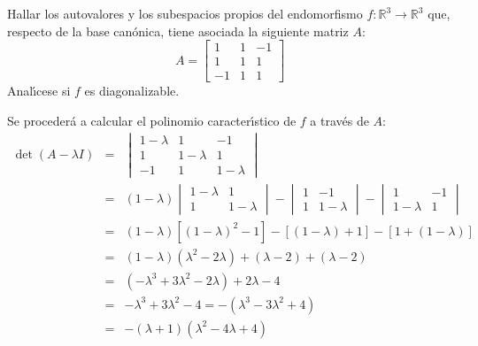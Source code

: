 \begin{enunciado}
 Hallar los autovalores y los subespacios propios del endomorfismo $f:\mathbb{R}^3 \rightarrow \mathbb{R}^3$ que, respecto de la base can\'onica, tiene asociada la siguiente matriz $A$:
 \begin{equation*}
  A = 
  \begin{bmatrix}
    1 & 1 & -1 \\
    1 & 1 &  1 \\
   -1 & 1 &  1
  \end{bmatrix}
 \end{equation*}
 Anal\'{\i}cese si $f$ es diagonalizable.
\end{enunciado}

\begin{solucion}
 Se proceder\'a a calcular el polinomio caracter\'{\i}stico de $f$ a trav\'es de $A$:
 \begin{eqnarray*}
  \det(A - \lambda I) & = & 
  \begin{vmatrix}
   1-\lambda & 1         & -1        \\
   1         & 1-\lambda &  1        \\
   -1        & 1         & 1-\lambda
  \end{vmatrix} \\
  & = & (1-\lambda)
  \begin{vmatrix}
   1 - \lambda & 1           \\
   1           & 1 - \lambda
  \end{vmatrix}
  -
  \begin{vmatrix}
   1 & -1          \\
   1 & 1 - \lambda
  \end{vmatrix}
  -
  \begin{vmatrix}
   1           & -1 \\
   1 - \lambda &  1
  \end{vmatrix} \\ 
  & = & (1-\lambda)\left[ (1-\lambda)^2 - 1 \right] - \left[ (1-\lambda) + 1 \right] - \left[ 1 + (1-\lambda) \right] \\
  & = & (1-\lambda)(\lambda^2 - 2\lambda) + (\lambda - 2) + (\lambda-2) \\ 
  & = & (-\lambda^3 + 3\lambda^2 -2\lambda) + 2\lambda - 4 \\ 
  & = & -\lambda^3 + 3\lambda^2 - 4 
  = -(\lambda^3 - 3\lambda^2 + 4) \\
  & = & -(\lambda+1)(\lambda^2 - 4\lambda +  4) \\ 

\end{eqnarray*}
\end{solucion}
